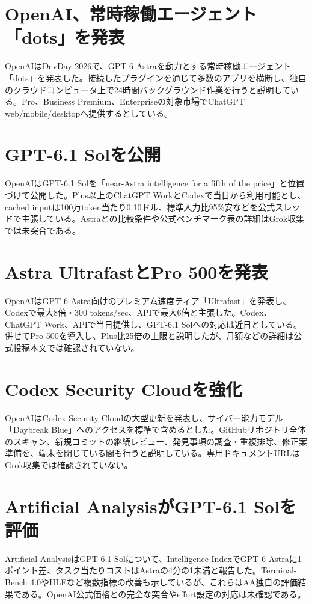 \section{OpenAI、常時稼働エージェント「dots」を発表}
OpenAIはDevDay 2026で、GPT-6 Astraを動力とする常時稼働エージェント「dots」を発表した。接続したプラグインを通じて多数のアプリを横断し、独自のクラウドコンピュータ上で24時間バックグラウンド作業を行うと説明している。Pro、Business Premium、Enterpriseの対象市場でChatGPT web/mobile/desktopへ提供するとしている。

\section{GPT-6.1 Solを公開}
OpenAIはGPT-6.1 Solを「near-Astra intelligence for a fifth of the price」と位置づけて公開した。Plus以上のChatGPT WorkとCodexで当日から利用可能とし、cached inputは100万token当たり0.10ドル、標準入力比95\%安などを公式スレッドで主張している。Astraとの比較条件や公式ベンチマーク表の詳細はGrok収集では未突合である。

\section{Astra UltrafastとPro 500を発表}
OpenAIはGPT-6 Astra向けのプレミアム速度ティア「Ultrafast」を発表し、Codexで最大8倍・300 tokens/sec、APIで最大6倍と主張した。Codex、ChatGPT Work、APIで当日提供し、GPT-6.1 Solへの対応は近日としている。併せてPro 500を導入し、Plus比25倍の上限と説明したが、月額などの詳細は公式投稿本文では確認されていない。

\section{Codex Security Cloudを強化}
OpenAIはCodex Security Cloudの大型更新を発表し、サイバー能力モデル「Daybreak Blue」へのアクセスを標準で含めるとした。GitHubリポジトリ全体のスキャン、新規コミットの継続レビュー、発見事項の調査・重複排除、修正案準備を、端末を閉じている間も行うと説明している。専用ドキュメントURLはGrok収集では確認されていない。

\section{Artificial AnalysisがGPT-6.1 Solを評価}
Artificial AnalysisはGPT-6.1 Solについて、Intelligence IndexでGPT-6 Astraに1ポイント差、タスク当たりコストはAstraの4分の1未満と報告した。Terminal-Bench 4.0やHLEなど複数指標の改善も示しているが、これらはAA独自の評価結果である。OpenAI公式価格との完全な突合やeffort設定の対応は未確認である。

